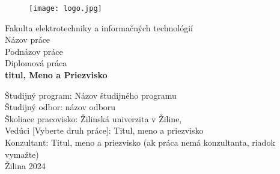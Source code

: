 \thispagestyle{empty} %
\begin{figure}[H] %
	\centering
	\texttt{[image: logo.jpg]}
\end{figure}

\begin{center} %
	\begin{Large}
		Fakulta elektrotechniky a informačných technológií \\

		\vspace{2cm}
		Názov práce \\
		\vspace{0.5cm}
		Podnázov práce \\
		\vspace{0.75cm}
		Diplomová práca \\
		\vspace{3cm}
		\textbf{titul, Meno a Priezvisko} \\
		\vfill
	\end{Large}
\end{center}
Študijný program: Názov študijného programu \\
Študijný odbor: názov odboru \\
Školiace pracovisko: Žilinská univerzita v Žiline, \\
Vedúci [Vyberte druh práce]: Titul, meno a priezvisko \\
Konzultant: Titul, meno a priezvisko (ak práca nemá konzultanta, riadok vymažte) \\
Žilina 2024 \\